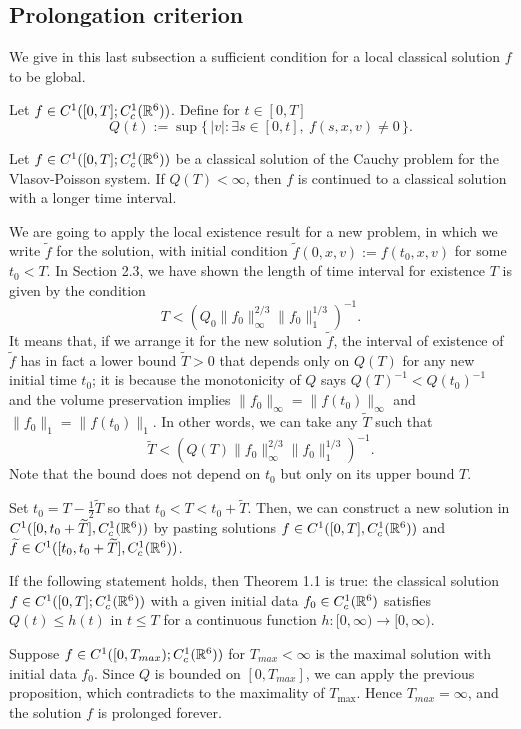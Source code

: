 \documentclass[12pt]{article}
\begin{document}
\subsection{Prolongation criterion}
We give in this last subsection a sufficient condition for a local classical solution $f$ to be global.
\begin{defn}
Let $f\in C^1([0,T];C_c^1(\mathbb{R}^6))$.
Define for $t\in[0,T]$
\[Q(t):=\sup\{\,|v|:\exists s\in[0,t],\ f(s,x,v)\ne0\,\}.\]
\end{defn}
\begin{prop}
Let $f\in C^1([0,T];C_c^1(\mathbb{R}^6))$ be a classical solution of the Cauchy problem for the Vlasov-Poisson system.
If $Q(T)<\infty$, then $f$ is continued to a classical solution with a longer time interval.
\end{prop}
\begin{pf}
We are going to apply the local existence result for a new problem, in which we write $\tilde f$ for the solution, with initial condition $\tilde f(0,x,v):=f(t_0,x,v)$ for some $t_0<T$.
In Section 2.3, we have shown the length of time interval for existence $T$ is given by the condition
\[T<(Q_0\|f_0\|_\infty^{2/3}\|f_0\|_1^{1/3})^{-1}.\]
It means that, if we arrange it for the new solution $\tilde f$, the interval of existence of $\tilde f$ has in fact a lower bound $\tilde T>0$ that depends only on $Q(T)$ for any new initial time $t_0$; it is because the monotonicity of $Q$ says $Q(T)^{-1}<Q(t_0)^{-1}$ and the volume preservation implies $\|f_0\|_\infty=\|f(t_0)\|_\infty$ and $\|f_0\|_1=\|f(t_0)\|_1$.
In other words, we can take any $\tilde T$ such that
\[\tilde T<(Q(T)\|f_0\|_\infty^{2/3}\|f_0\|_1^{1/3})^{-1}.\]
Note that the bound does not depend on $t_0$ but only on its upper bound $T$.

Set $t_0=T-\frac12\tilde T$ so that $t_0<T<t_0+\tilde T$.
Then, we can construct a new solution in $C^1([0,t_0+\widetilde T],C_c^1(\mathbb{R}^6))$ by pasting solutions $f\in C^1([0,T],C_c^1(\mathbb{R}^6))$ and $\widetilde f\in C^1([t_0,t_0+\widetilde T],C_c^1(\mathbb{R}^6))$.
\end{pf}

\begin{cor}
If the following statement holds, then Theorem 1.1 is true: the classical solution $f\in C^1([0,T];C_c^1(\mathbb{R}^6))$ with a given initial data $f_0\in C_c^1(\mathbb{R}^6)$ satisfies $Q(t)\le h(t)$ in $t\le T$ for a continuous function $h:[0,\infty)\to[0,\infty)$.
\end{cor}
\begin{pf}
Suppose $f\in C^1([0,T_{max});C_c^1(\mathbb{R}^6))$ for $T_{max}<\infty$ is the maximal solution with initial data $f_0$.
Since $Q$ is bounded on $[0,T_{max}]$, we can apply the previous proposition, which contradicts to the maximality of $T_{\max}$.
Hence $T_{max}=\infty$, and the solution $f$ is prolonged forever.
\end{pf}
\end{document}
